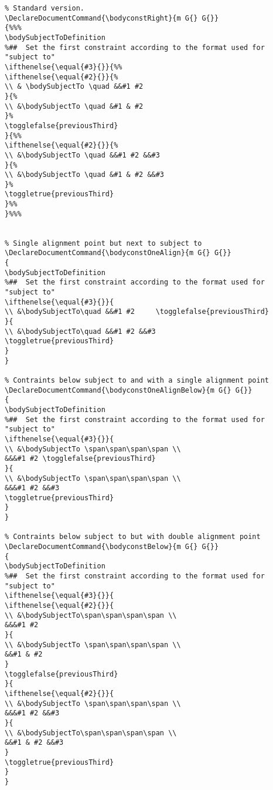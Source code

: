 \documentclass[a4paper]{article}
\begin{document}
\begin{lstlisting}
% Standard version.
\DeclareDocumentCommand{\bodyconstRight}{m G{} G{}}
{%%%
\bodySubjectToDefinition
%##  Set the first constraint according to the format used for "subject to"
\ifthenelse{\equal{#3}{}}{%%
\ifthenelse{\equal{#2}{}}{%
\\ & \bodySubjectTo \quad &&#1 #2 	
}{%
\\ &\bodySubjectTo \quad &#1 & #2
}%
\togglefalse{previousThird}
}{%%
\ifthenelse{\equal{#2}{}}{%
\\ &\bodySubjectTo \quad &&#1 #2 &&#3
}{%
\\ &\bodySubjectTo \quad &#1 & #2 &&#3
}%
\toggletrue{previousThird}
}%%
}%%%


% Single alignment point but next to subject to
\DeclareDocumentCommand{\bodyconstOneAlign}{m G{} G{}}
{
\bodySubjectToDefinition
%##  Set the first constraint according to the format used for "subject to"	
\ifthenelse{\equal{#3}{}}{
\\ &\bodySubjectTo\quad &&#1 #2 	\togglefalse{previousThird}
}{
\\ &\bodySubjectTo\quad &&#1 #2 &&#3
\toggletrue{previousThird}
}
}

% Contraints below subject to and with a single alignment point
\DeclareDocumentCommand{\bodyconstOneAlignBelow}{m G{} G{}}
{
\bodySubjectToDefinition
%##  Set the first constraint according to the format used for "subject to"	
\ifthenelse{\equal{#3}{}}{
\\ &\bodySubjectTo \span\span\span\span \\
&&&#1 #2 \togglefalse{previousThird}
}{
\\ &\bodySubjectTo \span\span\span\span \\
&&&#1 #2 &&#3	
\toggletrue{previousThird}
}	
}

% Contraints below subject to but with double alignment point
\DeclareDocumentCommand{\bodyconstBelow}{m G{} G{}}
{
\bodySubjectToDefinition
%##  Set the first constraint according to the format used for "subject to"	
\ifthenelse{\equal{#3}{}}{
\ifthenelse{\equal{#2}{}}{
\\ &\bodySubjectTo\span\span\span\span \\
&&&#1 #2 
}{
\\ &\bodySubjectTo \span\span\span\span \\
&&#1 & #2 
}
\togglefalse{previousThird}
}{
\ifthenelse{\equal{#2}{}}{
\\ &\bodySubjectTo \span\span\span\span \\
&&&#1 #2 &&#3
}{
\\ &\bodySubjectTo\span\span\span\span \\
&&#1 & #2 &&#3
}
\toggletrue{previousThird}	
}
}


\end{lstlisting}
\end{document}
